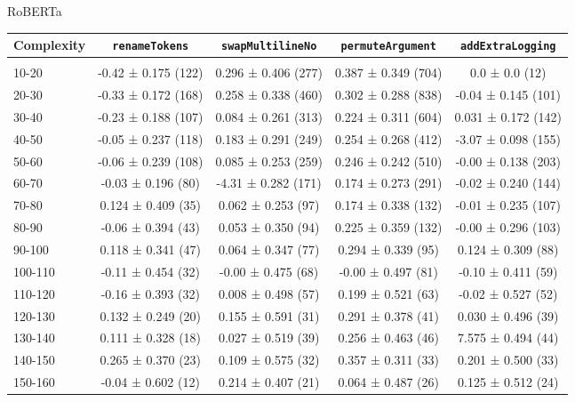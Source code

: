 \documentclass[sigconf,review,anonymous]{acmart}
\begin{document}
{    RoBERTa
    \begin{table}[H]
      \tiny
      \begin{tabular}{l|cccc}
        Complexity          & \lstinline|renameTokens|        & \lstinline|swapMultilineNo|     & \lstinline|permuteArgument|     & \lstinline|addExtraLogging|     \\\hline\\
        10-20               & -0.42 ± 0.175 (122) & 0.296 ± 0.406 (277) & 0.387 ± 0.349 (704) & 0.0 ± 0.0 (12)      \\
        20-30               & -0.33 ± 0.172 (168) & 0.258 ± 0.338 (460) & 0.302 ± 0.288 (838) & -0.04 ± 0.145 (101) \\
        30-40               & -0.23 ± 0.188 (107) & 0.084 ± 0.261 (313) & 0.224 ± 0.311 (604) & 0.031 ± 0.172 (142) \\
        40-50               & -0.05 ± 0.237 (118) & 0.183 ± 0.291 (249) & 0.254 ± 0.268 (412) & -3.07 ± 0.098 (155) \\
        50-60               & -0.06 ± 0.239 (108) & 0.085 ± 0.253 (259) & 0.246 ± 0.242 (510) & -0.00 ± 0.138 (203) \\
        60-70               & -0.03 ± 0.196 (80)  & -4.31 ± 0.282 (171) & 0.174 ± 0.273 (291) & -0.02 ± 0.240 (144) \\
        70-80               & 0.124 ± 0.409 (35)  & 0.062 ± 0.253 (97)  & 0.174 ± 0.338 (132) & -0.01 ± 0.235 (107) \\
        80-90               & -0.06 ± 0.394 (43)  & 0.053 ± 0.350 (94)  & 0.225 ± 0.359 (132) & -0.00 ± 0.296 (103) \\
        90-100              & 0.118 ± 0.341 (47)  & 0.064 ± 0.347 (77)  & 0.294 ± 0.339 (95)  & 0.124 ± 0.309 (88)  \\
        100-110             & -0.11 ± 0.454 (32)  & -0.00 ± 0.475 (68)  & -0.00 ± 0.497 (81)  & -0.10 ± 0.411 (59)  \\
        110-120             & -0.16 ± 0.393 (32)  & 0.008 ± 0.498 (57)  & 0.199 ± 0.521 (63)  & -0.02 ± 0.527 (52)  \\
        120-130             & 0.132 ± 0.249 (20)  & 0.155 ± 0.591 (31)  & 0.291 ± 0.378 (41)  & 0.030 ± 0.496 (39)  \\
        130-140             & 0.111 ± 0.328 (18)  & 0.027 ± 0.519 (39)  & 0.256 ± 0.463 (46)  & 7.575 ± 0.494 (44)  \\
        140-150             & 0.265 ± 0.370 (23)  & 0.109 ± 0.575 (32)  & 0.357 ± 0.311 (33)  & 0.201 ± 0.500 (33)  \\
        150-160             & -0.04 ± 0.602 (12)  & 0.214 ± 0.407 (21)  & 0.064 ± 0.487 (26)  & 0.125 ± 0.512 (24)  \\
      \end{tabular}
    \end{table}
  }
  
\end{document}
